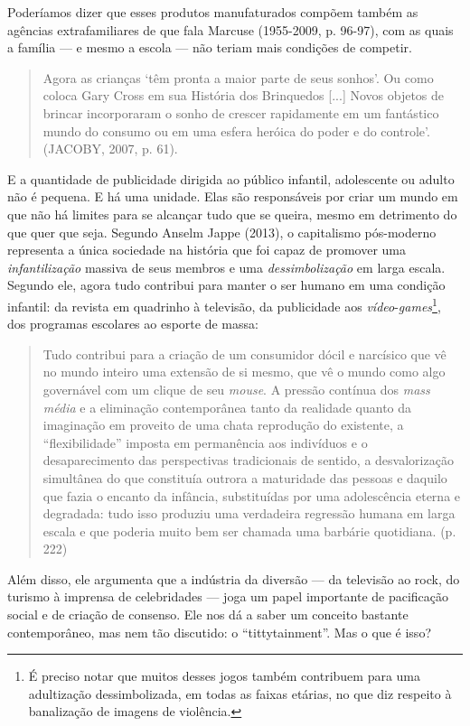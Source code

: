 Poderíamos dizer que esses produtos manufaturados compõem também as
agências extrafamiliares de que fala Marcuse (1955-2009, p. 96-97), com
as quais a família --- e mesmo a escola --- não teriam mais condições de
competir.

\begin{quote}
Agora as crianças `têm pronta a maior parte de seus sonhos'. Ou como
coloca Gary Cross em sua História dos Brinquedos {[}...{]} Novos objetos
de brincar incorporaram o sonho de crescer rapidamente em um fantástico
mundo do consumo ou em uma esfera heróica do poder e do controle'.
(JACOBY, 2007, p. 61).
\end{quote}

E a quantidade de publicidade dirigida ao público infantil, adolescente
ou adulto não é pequena. E há uma unidade. Elas são responsáveis por
criar um mundo em que não há limites para se alcançar tudo que se
queira, mesmo em detrimento do que quer que seja. Segundo Anselm Jappe
(2013), o capitalismo pós-moderno representa a única sociedade na
história que foi capaz de promover uma \emph{infantilização} massiva de
seus membros e uma \emph{dessimbolização} em larga escala. Segundo ele,
agora tudo contribui para manter o ser humano em uma condição infantil:
da revista em quadrinho à televisão, da publicidade aos
\emph{vídeo}-\emph{games}\footnote{É preciso notar que muitos desses
  jogos também contribuem para uma adultização dessimbolizada, em todas
  as faixas etárias, no que diz respeito à banalização de imagens de
  violência.}, dos programas escolares ao esporte de massa:

\begin{quote}
Tudo contribui para a criação de um consumidor dócil e narcísico que vê
no mundo inteiro uma extensão de si mesmo, que vê o mundo como algo
governável com um clique de seu \emph{mouse}. A pressão contínua dos
\emph{mass média} e a eliminação contemporânea tanto da realidade quanto
da imaginação em proveito de uma chata reprodução do existente, a
``flexibilidade'' imposta em permanência aos indivíduos e o
desaparecimento das perspectivas tradicionais de sentido, a
desvalorização simultânea do que constituía outrora a maturidade das
pessoas e daquilo que fazia o encanto da infância, substituídas por uma
adolescência eterna e degradada: tudo isso produziu uma verdadeira
regressão humana em larga escala e que poderia muito bem ser chamada uma
barbárie quotidiana. (p. 222)
\end{quote}

Além disso, ele argumenta que a indústria da diversão --- da televisão
ao rock, do turismo à imprensa de celebridades --- joga um papel
importante de pacificação social e de criação de consenso. Ele nos dá a
saber um conceito bastante contemporâneo, mas nem tão discutido: o
``tittytainment''. Mas o que é isso?

